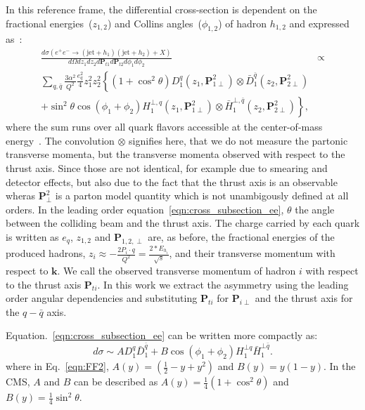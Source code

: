 In this reference frame, the differential cross-section is dependent on the fractional energies~($z_{1,2}$) and Collins angles~($\phi_{1,2}$) of hadron $h_{1,2}$ and expressed as~\cite{BoerThesis}:
\begin{equation}
\begin{aligned}
\frac{d\sigma(e^+e^-\rightarrow (\textrm{jet}+h_1)(\textrm{jet}+h_2)+X)}{d\Omega dz_1dz_2 d\boldsymbol{P}_{t1} d\boldsymbol{P}_{t2} d\phi_1d\phi_2}&\propto \\
\sum_{q,\bar{q}} \frac{3\alpha^2}{Q^2}\frac{e_q^2}{4}z^2_1z^2_2 \left\{ (1+\cos^2\theta)D_1^{q}(z_1,\boldsymbol{P}^2_{1\perp})\otimes\bar{D}_1^{\bar{q}}(z_2,\boldsymbol{P}^2_{2\perp})\right.\\  \left. +\sin^2\theta\cos(\phi_1+\phi_2)H_1^{\bot,q}(z_1,\boldsymbol{P}^2_{1\perp})\otimes\bar{H}_1^{\bot,\bar{q}}(z_2,\boldsymbol{P}^2_{2\perp})\right\},
\end{aligned}
\label{eqn:cross_subsection_ee}
\end{equation}
where the sum runs over all quark flavors accessible at the center-of-mass energy~\cite{BoerThesis}. The convolution $\otimes$ signifies here, that we do not measure the partonic transverse momenta, but the transverse momenta observed with respect to the thrust axis. Since those are not identical, for example due to smearing and detector effects, but also due to the fact that the thrust axis is an observable wheras $\boldsymbol{P}^2_{\perp}$ is a parton model quantity which is not unambigously defined at all orders. In the leading order equation~\ref{eqn:cross_subsection_ee},  $\theta$ the angle between the colliding beam and the thrust axis.
The charge carried by each quark is written as $e_q$, $z_{1,2}$ and $\boldsymbol{P}_{1,2,\perp}$ are, as before, the fractional energies of the produced hadrons, $z_i\approx -\frac{2P_{i}\cdot q}{Q^2}=\frac{2*E_{h_i} }{\sqrt{s}}$,  and their transverse momentum with respect to $\boldsymbol{k}$. We call the observed transverse momentum of hadron $i$ with respect to the thrust axis $\boldsymbol{P}_{ti}$. In this work we extract the asymmetry using the leading order angular dependencies and substituting $\boldsymbol{P}_{ti}$ for $\boldsymbol{P}_{i\perp}$ and the thrust axis for the $q-\bar{q}$ axis. 

Equation.~\ref{eqn:cross_subsection_ee} can be written more compactly as:
\begin{equation}
d\sigma \sim A D_1^q \bar{D}_1^{\bar{q}}+B\cos(\phi_1+\phi_2)H^{\bot q}_{1}\bar{H}^{\bot \bar{q} }_{1}.
\label{eqn:FF2}
\end{equation}
\noindent where in Eq.~\eqref{eqn:FF2}, $A(y)=(\frac{1}{2}-y+y^2)$ and $B(y)=y(1-y)$. In the CMS, $A$ and $B$ can be described as $A(y)=\frac{1}{4}(1+\cos^2\theta)$ and $B(y)=\frac{1}{4}\sin^2\theta$. 


